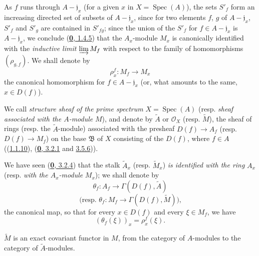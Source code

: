 As $f$ runs through $A-\mathfrak{j}_x$ (for a given $x$ in
$X=\operatorname{Spec}(A)$), the sets $S'_f$ form an increasing directed set
of subsets of $A-\mathfrak{j}_x$, since for two elements
$f$, $g$ of $A-\mathfrak{j}_x$, $S'_f$ and $S'_g$ are contained in
$S'_{fg}$; since the union of the $S'_f$ for $f\in A-\mathfrak{j}_x$ is
$A-\mathfrak{j}_x$, we conclude (\hyperref[0.1.4.5]{\textbf{0}, 1.4.5}) that the
$A_x$-module $M_x$ is canonically identified with the \emph{inductive limit}
$\varinjlim M_f$ with respect to the family of homomorphisms
$(\rho_{g,f})$. We shall denote by
\[
  \rho_x^f:M_f\longrightarrow M_x
\]
the canonical homomorphism for $f\in A-\mathfrak{j}_x$ (or, what amounts to
the same, $x\in D(f)$).

\begin{definition}[1.3.4]
\label{I.1.3.4}
We call \emph{structure sheaf of the prime spectrum}
$X=\operatorname{Spec}(A)$ (resp. \emph{sheaf associated with the $A$-module}
$M$), and denote by $\widetilde{A}$ or $\mathscr{O}_X$ \textup{(resp. $\widetilde{M}$)},
the sheaf of rings (resp. the $\widetilde{A}$-module) associated with the
presheaf $D(f)\to A_f$ \textup{(resp. $D(f)\to M_f$)} on the base $\mathfrak{B}$
of $X$ consisting of the $D(f)$, where $f\in A$
((\hyperref[I.1.1.10]{1.1.10}),
(\hyperref[0.3.2.1]{\textbf{0}, 3.2.1} and
\hyperref[0.3.5.6]{3.5.6})).
\end{definition}

We have seen (\hyperref[0.3.2.4]{\textbf{0}, 3.2.4}) that the stalk
$\widetilde{A}_x$ (resp. $\widetilde{M}_x$) \emph{is identified with the ring}
$A_x$ (resp. \emph{with the $A_x$-module} $M_x$); we shall denote by
\[
  \theta_f:A_f\longrightarrow\Gamma(D(f),\widetilde{A})
\]
\[
  \text{(resp. }\theta_f:M_f\longrightarrow
  \Gamma(D(f),\widetilde{M})\text{),}
\]
the canonical map, so that for every $x\in D(f)$ and every
$\xi\in M_f$, we have
\begin{equation}
  (\theta_f(\xi))_x=\rho_x^f(\xi).
  \tag{1.3.4.1}\label{I.1.3.4.1}
\end{equation}

\begin{proposition}[1.3.5]
\label{I.1.3.5}
$\widetilde{M}$ is an exact covariant functor in $M$, from the category of
$A$-modules to the category of $\widetilde{A}$-modules.
\end{proposition}

